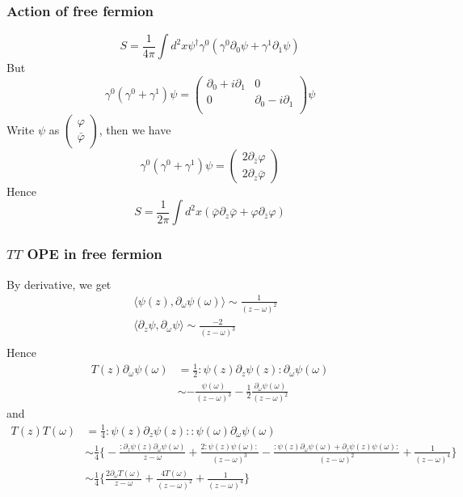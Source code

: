 \documentclass[11pt,a4paper]{article}
\theoremstyle{definition}
\begin{document}
 \subsubsection{Action of free fermion}
 \[
 S = \frac{1}{4\pi} \int d^2 x \psi^\dagger \gamma^0(\gamma^0 \partial_0 \psi + \gamma^1 \partial_1 \psi)
 \]
 But
 \[
 \gamma^0(\gamma^0 + \gamma^1) \psi = \begin{pmatrix}
 \partial_0 + i \partial_1& 0 \\
 0 & \partial_0 - i \partial_1\\
 \end{pmatrix} \psi
 \]
 Write $\psi$ as $\begin{pmatrix}
 \varphi\\ \bar{\varphi}
 \end{pmatrix}$, then we have $$ \gamma^0(\gamma^0 + \gamma^1) \psi = \begin{pmatrix}
 2\partial_{\bar{z}} \varphi\\ 2 \partial_{z} \bar{\varphi}
 \end{pmatrix}$$
 Hence 
 \[
	S = \frac{1}{2\pi} \int d^2 x (\bar{\varphi} \partial_{z} \bar{\varphi} +  \varphi \partial_{\bar{z}} \varphi)
 \]
 \subsubsection{$TT$ OPE in free fermion}
By derivative, we get 
\[
\begin{aligned}
\langle \psi (z), \partial_\omega \psi(\omega) \rangle \sim \frac{1}{(z-\omega)^2}& \\
 \langle \partial_z \psi , \partial_\omega \psi \rangle \sim \frac{-2}{(z-\omega)^3}&\\
\end{aligned}
\]
Hence 
\[
\begin{aligned}
T(z) \partial_\omega \psi(\omega) & = \frac{1}{2} : \psi(z) \partial_z \psi(z): \partial_\omega \psi(\omega)\\
& \sim -\frac{\psi(\omega)}{(z-\omega)^3} - \frac{1}{2} \frac{\partial_\omega \psi (\omega)}{(z-\omega)^2}
\end{aligned}
\]
and 
\[
\begin{aligned}
T(z)T(\omega) &= \frac{1}{4} : \psi(z) \partial_z \psi(z) :: \psi(\omega) \partial_\omega \psi(\omega)\\
& \sim \frac{1}{4} \big\{ - \frac{:\partial_z \psi(z) \partial_\omega \psi(\omega)}{z-\omega} + \frac{2: \psi(z) \psi(\omega):}{(z-\omega)^3} - \frac{: \psi(z) \partial_\omega \psi(\omega) + \partial_z \psi(z) \psi(\omega):}{(z-\omega)^2} + \frac{1}{(z-\omega)^4} \big\}\\
&\sim \frac{1}{4} \big\{\frac{2 \partial_\omega T(\omega)}{z-\omega} + \frac{4T(\omega)}{(z-\omega)^2} + \frac{1}{(z-\omega)^4}  \big\}
\end{aligned}
\]
\end{document}
